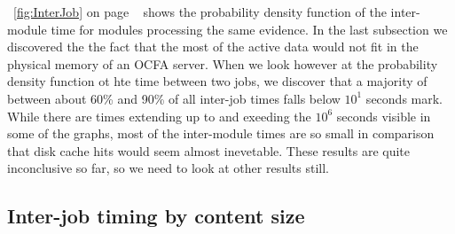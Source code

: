  ~\ref{fig:InterJob} on page ~\pageref{fig:Interjob} shows the probability density function of the inter-module time for modules processing the same evidence.
In the last subsection we discovered the the fact that the most of the active data would not fit in the physical memory of an OCFA server. When we look however at the probability density function ot hte time between two jobs, we discover that a majority of between about 60\% and 90\% of all inter-job times falls below $10^1$ seconds mark. While there are times extending up to and exeeding the $10^6$ seconds visible in some of the graphs, most of the inter-module times are so small in comparison that disk cache hits would seem almost inevetable. These results are quite inconclusive so far, so we need to look at other results still.
\subsection{Inter-job timing by content size}
